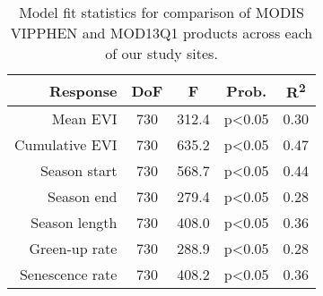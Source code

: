 \begin{table}[h]
\centering
\begin{tabular}{rcccc}
  \hline
Response & DoF & F & Prob. & R\textsuperscript{2} \\ 
  \hline
Mean EVI & 730 & 312.4 & p<0.05 & 0.30 \\ 
  Cumulative EVI & 730 & 635.2 & p<0.05 & 0.47 \\ 
  Season start & 730 & 568.7 & p<0.05 & 0.44 \\ 
  Season end & 730 & 279.4 & p<0.05 & 0.28 \\ 
  Season length & 730 & 408.0 & p<0.05 & 0.36 \\ 
  Green-up rate & 730 & 288.9 & p<0.05 & 0.28 \\ 
  Senescence rate & 730 & 408.2 & p<0.05 & 0.36 \\ 
   \hline
\end{tabular}
\caption{Model fit statistics for comparison of MODIS VIPPHEN and MOD13Q1 products across each of our study sites.} 
\label{annot_df}
\end{table}

